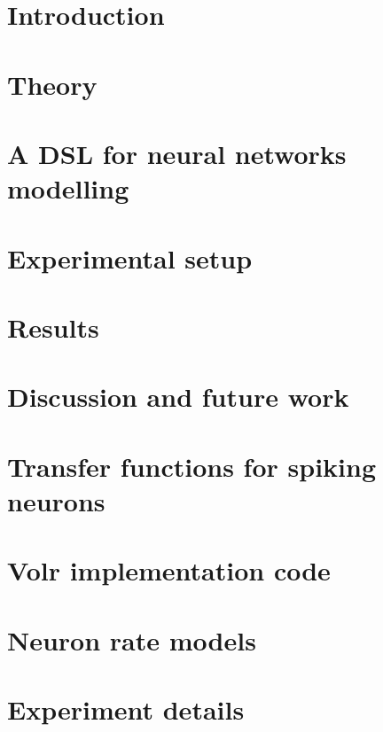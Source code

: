 \documentclass[a4paper,oneside]{memoir}
\begin{document}
\chapter{Introduction} \label{sec:intro}
  

\chapter{Theory} \label{sec:theory}
  

\chapter{A DSL for neural networks modelling} \label{sec:dsl}
  

\chapter{Experimental setup} \label{sec:experiment}
  

  \chapter{Results} \label{sec:results}
  

\chapter{Discussion and future work} \label{sec:discussion}
  

\appendix
\clearpage

\begingroup
\renewcommand{\cleardoublepage}{}
\renewcommand{\clearpage}{}
\chapter{Transfer functions for spiking neurons} \label{app:transfer}
  
\chapter{Volr implementation code} \label{app:implementation}
  
\chapter{Neuron rate models} \label{app:verification}
  
\chapter{Experiment details} \label{app:experiment}
  

\endgroup
\backmatter

\printglossary

\printbibliography
 
\printindex
\end{document}
